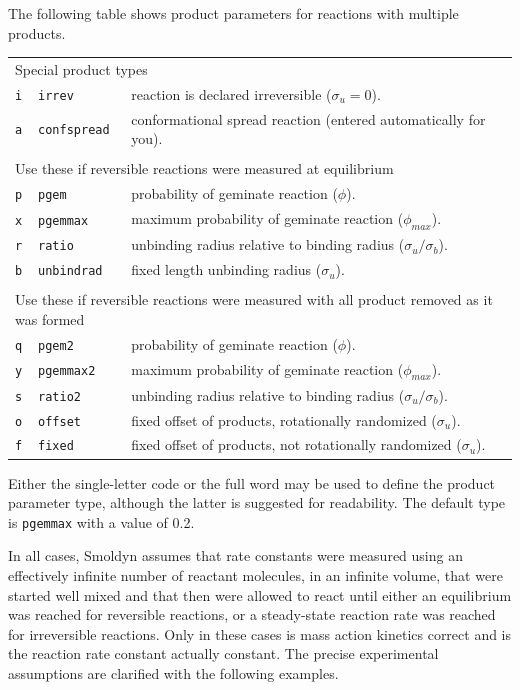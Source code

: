 \documentclass {scrbook}
\newcommand {\ttt} {\texttt}
\begin{document}
The following table shows product parameters for reactions with multiple products.

\begin{longtable}[c]{lll}
\multicolumn{3}{l}{Special product types}\\
\ttt{i} & \ttt{irrev} & reaction is declared irreversible ($\sigma_u=0$).\\
\ttt{a} & \ttt{confspread} & conformational spread reaction (entered automatically for you).\\ \\
\multicolumn{3}{l}{Use these if reversible reactions were measured at equilibrium}\\
\ttt{p} & \ttt{pgem} & probability of geminate reaction ($\phi$).\\
\ttt{x} & \ttt{pgemmax} & maximum probability of geminate reaction ($\phi_{max}$).\\
\ttt{r} & \ttt{ratio} & unbinding radius relative to binding radius ($\sigma_u/\sigma_b$).\\
\ttt{b} & \ttt{unbindrad} & fixed length unbinding radius ($\sigma_u$).\\ \\
\multicolumn{3}{l}{Use these if reversible reactions were measured with all product removed as it was formed}\\
\ttt{q} & \ttt{pgem2} & probability of geminate reaction ($\phi$).\\
\ttt{y} & \ttt{pgemmax2} & maximum probability of geminate reaction ($\phi_{max}$).\\
\ttt{s} & \ttt{ratio2} & unbinding radius relative to binding radius ($\sigma_u/\sigma_b$).\\
\ttt{o} & \ttt{offset} & fixed offset of products, rotationally randomized ($\sigma_u$).\\
\ttt{f} & \ttt{fixed} & fixed offset of products, not rotationally randomized ($\sigma_u$).
\end{longtable}

Either the single-letter code or the full word may be used to define the product parameter type, although the latter is suggested for readability. The default type is \ttt{pgemmax} with a value of 0.2.

In all cases, Smoldyn assumes that rate constants were measured using an effectively infinite number of reactant molecules, in an infinite volume, that were started well mixed and that then were allowed to react until either an equilibrium was reached for reversible reactions, or a steady-state reaction rate was reached for irreversible reactions. Only in these cases is mass action kinetics correct and is the reaction rate constant actually constant. The precise experimental assumptions are clarified with the following examples.
\end{document}
